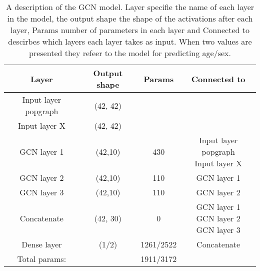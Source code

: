 \begin{table}[H]
    \centering
    \caption{A description of the GCN model. Layer specifie the name of each layer in the model, the output shape the shape of the activations after each layer, Params number of parameters in each layer and Connected to descirbes which layers each layer takes as input. When two values are presented they refeer to the model for predicting age/sex. }
    \begin{tabular}{c|c c c}
         Layer & Output shape & Params & Connected to\\ \hline\hline
         Input layer popgraph &(42, 42) & & \\ \hline
         Input layer X &  (42, 42)& & \\ \hline
         GCN layer 1 & (42,10) & 430 & \thead{Input layer popgraph \\ Input layer X}   \\ \hline
         GCN layer 2 & (42,10)& 110 & GCN layer 1\\ \hline
         GCN layer 3 & (42,10)& 110  &GCN layer 2\\ \hline
         Concatenate &(42, 30)  & 0 & \thead{GCN layer 1\\GCN layer 2\\GCN layer 3} \\ \hline
         Dense layer & (1/2) & 1261/2522 & Concatenate \\ \hline\hline
         Total params:& & 1911/3172
    \end{tabular}
    \label{tab:Models_GCN}
\end{table}

